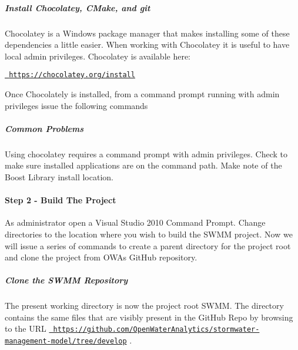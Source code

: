 \subparagraph*{Install Chocolatey, C\+Make, and git}

Chocolatey is a Windows package manager that makes installing some of these dependencies a little easier. When working with Chocolatey it is useful to have local admin privileges. Chocolatey is available here\+:

\href{https://chocolatey.org/install}{\texttt{ https\+://chocolatey.\+org/install}}

Once Chocolately is installed, from a command prompt running with admin privileges issue the following commands


\begin{DoxyCode}{0}
\end{DoxyCode}


\subparagraph*{Common Problems}

Using chocolatey requires a command prompt with admin privileges. Check to make sure installed applications are on the command path. Make note of the Boost Library install location.

\paragraph*{Step 2 -\/ Build The Project}

As administrator open a Visual Studio 2010 Command Prompt. Change directories to the location where you wish to build the S\+W\+MM project. Now we will issue a series of commands to create a parent directory for the project root and clone the project from O\+WA\textquotesingle{}s Git\+Hub repository.

\subparagraph*{Clone the S\+W\+MM Repository}


\begin{DoxyCode}{0}
\end{DoxyCode}


The present working directory is now the project root S\+W\+MM. The directory contains the same files that are visibly present in the Git\+Hub Repo by browsing to the U\+RL \href{https://github.com/OpenWaterAnalytics/stormwater-management-model/tree/develop}{\texttt{ https\+://github.\+com/\+Open\+Water\+Analytics/stormwater-\/management-\/model/tree/develop}} .

